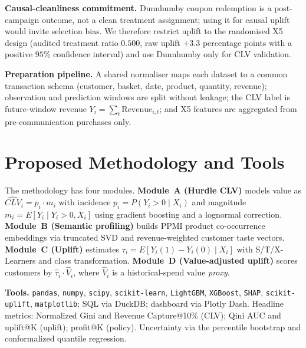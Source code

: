 \documentclass[pdflatex,sn-mathphys-num]{sn-jnl}
\begin{document}
\noindent\textbf{Causal-cleanliness commitment.} Dunnhumby coupon redemption is a post-campaign
outcome, not a clean treatment assignment; using it for causal uplift would invite selection bias.
We therefore restrict uplift to the randomised X5 design (audited treatment ratio $0.500$, raw
uplift $+3.3$ percentage points with a positive $95\%$ confidence interval) and use Dunnhumby only
for CLV validation.

\noindent\textbf{Preparation pipeline.} A shared normaliser maps each dataset to a common
transaction schema (customer, basket, date, product, quantity, revenue); observation and prediction
windows are split without leakage; the CLV label is future-window revenue
$Y_i=\sum_{t}\text{Revenue}_{i,t}$; and X5 features are aggregated from pre-communication purchases
only.

\section{Proposed Methodology and Tools}\label{sec:method}
The methodology has four modules. \textbf{Module~A (Hurdle CLV)} models value as
$\widehat{CLV}_i=p_i\cdot m_i$ with incidence $p_i=P(Y_i>0\mid X_i)$ and magnitude
$m_i=E[Y_i\mid Y_i>0,X_i]$ using gradient boosting and a lognormal correction.
\textbf{Module~B (Semantic profiling)} builds PPMI product co-occurrence embeddings via truncated
SVD and revenue-weighted customer taste vectors. \textbf{Module~C (Uplift)} estimates
$\tau_i=E[Y_i(1)-Y_i(0)\mid X_i]$ with S/T/X-Learners and class transformation. \textbf{Module~D
(Value-adjusted uplift)} scores customers by $\hat\tau_i\cdot\hat V_i$, where $\hat V_i$ is a
historical-spend value \emph{proxy}.

\noindent\textbf{Tools.} \texttt{pandas}, \texttt{numpy}, \texttt{scipy},
\texttt{scikit-learn}, \texttt{LightGBM}, \texttt{XGBoost}, \texttt{SHAP},
\texttt{scikit-uplift}, \texttt{matplotlib}; SQL via DuckDB; dashboard via Plotly Dash.
Headline metrics: Normalized Gini and Revenue Capture@10\% (CLV); Qini AUC and uplift@K (uplift);
profit@K (policy). Uncertainty via the percentile bootstrap and conformalized quantile regression.

\end{document}
